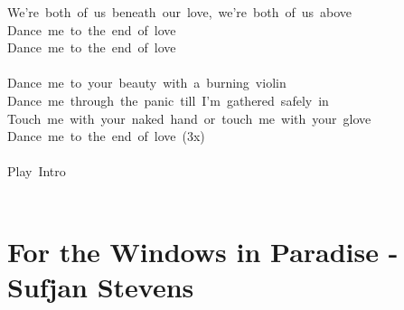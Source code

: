 \documentclass[]{book}
\let\stdsection\section
\renewcommand\section{\clearpage\stdsection}
\begin{document}
We're~both~of~us~beneath~our~love,~we're~both~of~us~above~\\
Dance~me~to~the~end~of~love~\\
Dance~me~to~the~end~of~love\\
~\\
Dance~me~to~your~beauty~with~a~burning~violin~\\
Dance~me~through~the~panic~till~I'm~gathered~safely~in~\\
Touch~me~with~your~naked~hand~or~touch~me~with~your~glove~\\
Dance~me~to~the~end~of~love~(3x)\\
~\\
Play~Intro\\
~\\

\hypertarget{for-the-windows-in-paradise---sufjan-stevens}{%
\section{For the Windows in Paradise - Sufjan Stevens}\label{for-the-windows-in-paradise---sufjan-stevens}}
\end{document}
